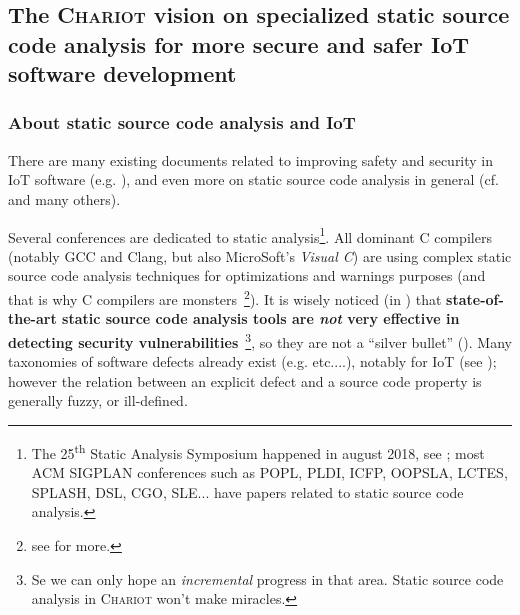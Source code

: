 \bigskip



\subsection{The \textsc{Chariot} vision on specialized static source code analysis for more secure and safer IoT software development}
\label{subsec:chariotvision}

\subsubsection{About static source code analysis and IoT}

 
There are many existing documents related to improving safety and
security in IoT software (e.g. \cite{Chen:2011:DAS, Medwed:2016:ISC}),
and even more on static source code analysis in general
(cf. \cite{Gomes2009AnOO, GosevaPopstojanova2015OnTC,
  Binkley:2007:SCA} and many others). %

Several conferences are dedicated to static analysis\footnote{The
  25\textsuperscript{th} Static Analysis Symposium happened in
  august 2018, see
  ; most ACM
  SIGPLAN conferences such as POPL, PLDI, ICFP, OOPSLA, LCTES, SPLASH,
  DSL, CGO, SLE... have papers related to static source code
  analysis.}.  All dominant C compilers (notably GCC and Clang, but
also MicroSoft's \emph{Visual C}\texttrademark) are using complex
static source code analysis techniques for optimizations and warnings
purposes (and that is why C compilers are monsters~\footnote{see
  for more.}). It is wisely noticed (in
\cite{GosevaPopstojanova2015OnTC}) that \textbf{state-of-the-art
  static source code analysis tools are \emph{not} very effective in
  detecting  security
  vulnerabilities}~\footnote{Se we can only hope an \emph{incremental}
  progress in that area. Static source code analysis in
  \textsc{Chariot} won't make miracles.}, so they are not a ``silver
bullet''  (\cite{Brooks:1987:NSB}). Many
taxonomies of software defects  already exist
(e.g. \cite{Silva:2016:SES, Wagner:2008:DCD, Levine:2009:DDE}
etc....), notably for IoT (see \cite{Carpent:2018:RRA,
  Ahmad:2018:ModelBasedIoT, Laszlo:2017:Vessedia}); however the
relation between an explicit defect and a source code property is
generally fuzzy, or ill-defined.

